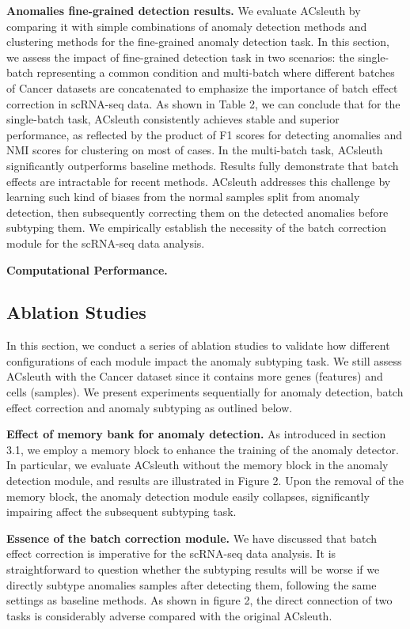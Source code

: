 \documentclass{article}
\begin{document}
\textbf{Anomalies fine-grained detection results.}	We evaluate ACsleuth by comparing it with simple combinations 
of anomaly detection methods and clustering methods for the fine-grained anomaly detection task. In 
this section, we assess the impact of fine-grained detection task in two scenarios: the 
single-batch representing a common condition and multi-batch where different batches of 
Cancer datasets are concatenated to emphasize the importance of batch effect correction 
in scRNA-seq data. As shown in Table 2, we can conclude that for the single-batch task, 
ACsleuth consistently achieves stable and superior performance, as reflected by the product 
of F1 scores for detecting anomalies and NMI scores for clustering on most of cases. In 
the multi-batch task, ACsleuth significantly outperforms baseline methods. Results fully 
demonstrate that batch effects are intractable for recent methods. ACsleuth addresses this 
challenge by learning such kind of biases from the normal samples split from anomaly 
detection, then subsequently correcting them on the detected anomalies before subtyping 
them. We empirically establish the necessity of the batch correction module for the scRNA-seq data analysis.

\textbf{Computational Performance.}
\subsection{Ablation Studies}
In this section, we conduct a series of ablation studies to validate how different 
configurations of each module impact the anomaly subtyping task. We still assess ACsleuth with 
the Cancer dataset since it contains more genes (features) and cells (samples). We 
present experiments sequentially for anomaly detection, batch effect correction and anomaly 
subtyping as outlined below.

\textbf{Effect of memory bank for anomaly detection.}	As introduced in section 3.1, 
we employ a memory block to enhance the training of the anomaly detector. In particular, 
we evaluate ACsleuth without the memory block in the anomaly detection module, and results are 
illustrated in Figure 2. Upon the removal of the memory block, the anomaly detection 
module easily collapses, significantly impairing affect the subsequent subtyping task.

\textbf{Essence of the batch correction module.}	We have discussed that batch effect correction 
is imperative for the scRNA-seq data analysis. It is straightforward to question whether 
the subtyping results will be worse if we directly subtype anomalies samples after 
detecting them, following the same settings as baseline methods. As shown in figure 2, 
the direct connection of two tasks is considerably adverse compared with the original ACsleuth.
\end{document}
